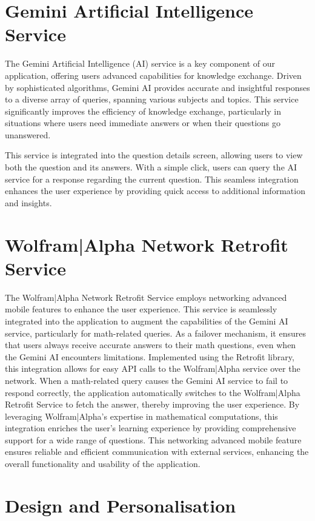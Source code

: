 \section{Gemini Artificial Intelligence Service}

The Gemini Artificial Intelligence (AI) service is a key component of our application, offering users advanced capabilities for knowledge exchange. Driven by sophisticated algorithms, Gemini AI provides accurate and insightful responses to a diverse array of queries, spanning various subjects and topics. This service significantly improves the efficiency of knowledge exchange, particularly in situations where users need immediate answers or when their questions go unanswered. 

This service is integrated into the question details screen, allowing users to view both the question and its answers. With a simple click, users can query the AI service for a response regarding the current question. This seamless integration enhances the user experience by providing quick access to additional information and insights.

\section{Wolfram|Alpha Network Retrofit Service}

The Wolfram|Alpha Network Retrofit Service employs networking advanced mobile features to enhance the user experience. This service is seamlessly integrated into the application to augment the capabilities of the Gemini AI service, particularly for math-related queries. As a failover mechanism, it ensures that users always receive accurate answers to their math questions, even when the Gemini AI encounters limitations. Implemented using the Retrofit library, this integration allows for easy API calls to the Wolfram|Alpha service over the network. When a math-related query causes the Gemini AI service to fail to respond correctly, the application automatically switches to the Wolfram|Alpha Retrofit Service to fetch the answer, thereby improving the user experience. By leveraging Wolfram|Alpha's expertise in mathematical computations, this integration enriches the user's learning experience by providing comprehensive support for a wide range of questions. This networking advanced mobile feature ensures reliable and efficient communication with external services, enhancing the overall functionality and usability of the application.

\section{Design and Personalisation}


